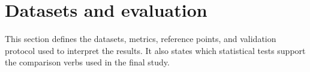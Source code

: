 \section{Datasets and evaluation}
\label{sec:fund:eval}

This section defines the datasets, metrics, reference points, and validation protocol
used to interpret the results. It also states which statistical tests support the
comparison verbs used in the final study.
